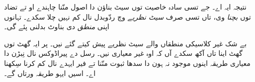 \documentclass[../../../include/open-logic-section]{subfiles}
\begin{document}
نتیجہ ایہ اے۔ جے تسی سادہ خاصیت توں سیٹ بناؤن دا اصول منّنا چاہندے او
تے تضاد توں \emph{بچنا} وی، تاں تسی صرف \emph{سیٹ نظریے} وچ ردّوبدل نال
کم نہیں چلا سکدے۔ تہانوں اپنی \emph{منطق} دی بناوٹ بدلنی پئے گی۔

بے شک غیر کلاسیکی منطقاں والے سیٹ نظریے پیش کیتے گئے نیں۔ پر ایہ
گھٹ توں گھٹ اینا تاں آکھ سکدے آں کہ اوہ غیر معیاری نیں۔ رسل دے پیراڈوکس
نال نِبڑن دا معیاری طریقہ اینوں موجود نہ ہون دا سدھا ثبوت منّنا تے فیر
ایہدے نال کم کرنا سِکھنا اے۔ اسیں ایہو طریقہ ورتاں گے۔
\end{document}
